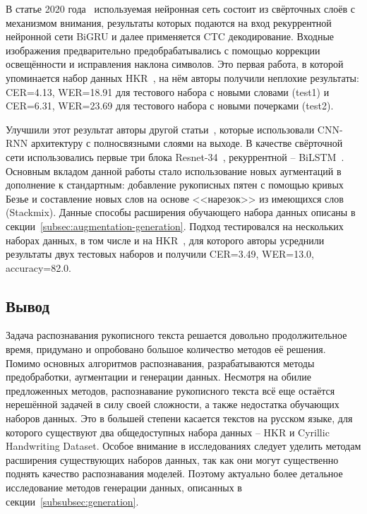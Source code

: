 В статье 2020 года~\cite{abdallah2020attention} используемая нейронная сеть состоит из свёрточных слоёв с механизмом внимания,
результаты которых подаются на вход рекуррентной нейронной сети BiGRU и далее применяется CTC декодирование.
Входные изображения предварительно предобрабатывались с помощью коррекции освещённости и исправления наклона символов.
Это первая работа, в которой упоминается набор данных HKR~\cite{nurseitov2021handwritten},
на нём авторы получили неплохие результаты: CER=4.13, WER=18.91 для тестового набора с новыми словами (test1) и
CER=6.31, WER=23.69 для тестового набора с новыми почерками (test2).

Улучшили этот результат авторы другой статьи~\cite{shonenkov2021stackmix}, которые использовали CNN-RNN архитектуру с полносвязными слоями на выходе.
В качестве свёрточной сети использовались первые три блока Resnet-34~\cite{he2016deep}, рекуррентной -- BiLSTM~\cite{hochreiter1997long}.
Основным вкладом данной работы стало использование новых аугментаций в дополнение к стандартным:
добавление рукописных пятен с помощью кривых Безье и составление новых слов на основе <<нарезок>> из имеющихся слов (Stackmix).
Данные способы расширения обучающего набора данных описаны в секции~\ref{subsec:augmentation-generation}.
Подход тестировался на нескольких наборах данных, в том числе и на HKR~\cite{nurseitov2021handwritten},
для которого авторы усреднили результаты двух тестовых наборов и получили CER=3.49, WER=13.0, accuracy=82.0.


\subsection{Вывод}
\label{subsec:review_conclusion}

Задача распознавания рукописного текста решается довольно продолжительное время,
придумано и опробовано большое количество методов её решения.
Помимо основных алгоритмов распознавания, разрабатываются методы предобработки, аугментации и генерации данных.
Несмотря на обилие предложенных методов, распознавание рукописного текста всё еще остаётся нерешённой задачей в силу
своей сложности, а также недостатка обучающих наборов данных.
Это в большей степени касается текстов на русском языке, для которого существуют два общедоступных набора данных --
HKR и Cyrillic Handwriting Dataset.
Особое внимание в исследованиях следует уделить методам расширения существующих наборов данных,
так как они могут существенно поднять качество распознавания моделей.
Поэтому актуально более детальное исследование методов генерации данных, описанных в секции~\ref{subsubsec:generation}.
